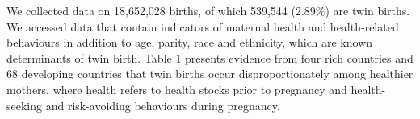 \documentclass{nature}
\begin{document}
\begin{linenumbers}

We collected data on 18,652,028 births, of which 539,544 (2.89\%) are twin births. We accessed data that contain indicators of maternal health and health-related behaviours in addition to age, parity, race and ethnicity, which are known determinants of twin birth\cite{Bulmer1970}. %
Table 1 presents evidence from four rich countries and 68 developing countries that twin births occur disproportionately among healthier mothers, where health refers to health stocks prior to pregnancy and health-seeking and risk-avoiding behaviours during pregnancy. %


\end{linenumbers}
\end{document}
